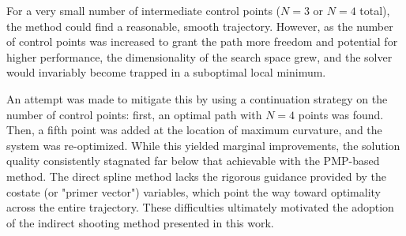 \documentclass[journal, a4paper]{IEEEtran}
\begin{document}
For a very small number of intermediate control points ($N=3$ or $N=4$ total), the method could find a reasonable, smooth trajectory. However, as the number of control points was increased to grant the path more freedom and potential for higher performance, the dimensionality of the search space grew, and the solver would invariably become trapped in a suboptimal local minimum.

An attempt was made to mitigate this by using a continuation strategy on the number of control points: first, an optimal path with $N=4$ points was found. Then, a fifth point was added at the location of maximum curvature, and the system was re-optimized. While this yielded marginal improvements, the solution quality consistently stagnated far below that achievable with the PMP-based method. The direct spline method lacks the rigorous guidance provided by the costate (or "primer vector") variables, which point the way toward optimality across the entire trajectory. These difficulties ultimately motivated the adoption of the indirect shooting method presented in this work.




\end{document}
